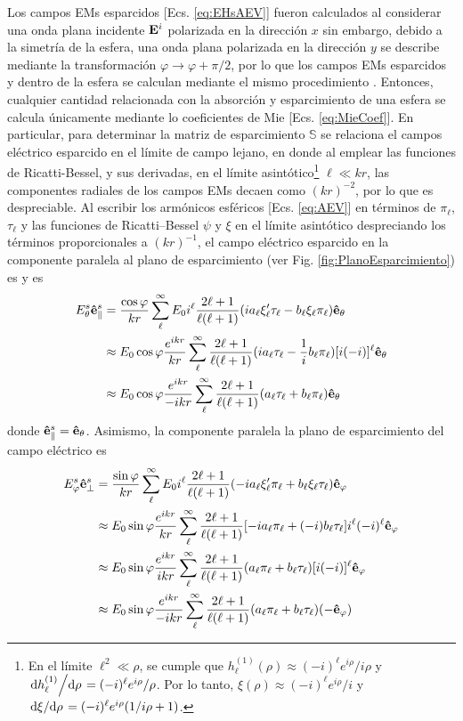 \documentclass[letterpaper,11pt] {article}
\begin{document}
Los campos EMs esparcidos [Ecs. \eqref{eq:EHsAEV}] fueron calculados al considerar una onda plana incidente $\vb{E}^i$ polarizada en la dirección $x$ sin embargo, debido a la simetría de la esfera, una onda plana polarizada en la dirección $y$ se describe mediante la transformación $\varphi\to\varphi+\pi/2$, por lo que los campos EMs esparcidos y dentro de la esfera se calculan mediante el mismo procedimiento \cite{bohren1998absorption}. Entonces, cualquier cantidad relacionada con la absorción y esparcimiento de una esfera se calcula únicamente mediante lo coeficientes de Mie [Ecs. \eqref{eq:MieCoef}]. En particular, para determinar la matriz de esparcimiento $\mathbb{S}$ se relaciona el campos eléctrico esparcido en el límite de campo lejano, en donde al emplear las funciones de Ricatti-Bessel, y sus derivadas, en el límite asintótico\footnote{En el límite $\ell^2 \ll \rho$, se cumple que $h_\ell^{(1)}(\rho)\approx (-i)^\ell e^{i\rho}/i\rho$ y $\dv*{h_\ell^{(1)}}{\rho} = (-i)^\ell e^{i\rho}/\rho$. Por lo tanto,  $\xi(\rho)\approx (-i)^\ell e^{i\rho}/i$ y $\dv*{\xi}{\rho} = (-i)^\ell e^{i\rho}(1/i\rho + 1)$.} $\ell \ll kr$, las componentes radiales de los campos EMs decaen como $(kr)^{-2}$, por lo que es despreciable. Al escribir los armónicos esféricos  [Ecs. \eqref{eq:AEV}] en términos de $\pi_\ell$, $\tau_\ell$ y las funciones de Ricatti--Bessel $\psi$ y $\xi$ en el límite asintótico despreciando los términos proporcionales a $(kr)^{-1}$, el campo eléctrico esparcido en la componente paralela al plano de esparcimiento (ver Fig. \ref{fig:PlanoEsparcimiento}) es
  y  es
	\begin{align}
	E_\theta^s \vu{e}_\parallel^s &= \frac{\cos\varphi}{kr}\sum_\ell^\infty E_0i^\ell
		\frac{2\ell+1}{\ell(\ell+1)}(i a_\ell\xi_\ell'\tau_\ell-b_\ell\xi_\ell\pi_\ell)\vu{e}_\theta\notag\\
			&\approx E_0\cos\varphi\frac{e^{ikr}}{kr}\sum_\ell^\infty\frac{2\ell+1}{\ell(\ell+1)}
				(i a_\ell \tau_\ell - \frac{1}{i}b_\ell\pi_\ell )[i(-i)]^\ell\vu{e}_\theta\notag\\
			&\approx E_0\cos\varphi\frac{e^{ikr}}{-ikr}\sum_\ell^\infty\frac{2\ell+1}{\ell(\ell+1)}
				( a_\ell \tau_\ell + b_\ell\pi_\ell )\vu{e}_\theta
								\label{eq:EthetaS}
	\end{align}
donde $\vu{e}_\parallel^s =\vu{e}_\theta$. Asimismo, la componente paralela la plano de esparcimiento del campo eléctrico es
	\begin{align}
	E_\varphi^s \vu{e}_\perp^s &= \frac{\sin\varphi}{kr}\sum_\ell^\infty E_0i^\ell\frac{2\ell+1}{\ell(\ell+1)}						(-ia_\ell\xi_\ell'\pi_\ell+b_\ell\xi_\ell\tau_\ell)\vu{e}_\varphi\notag\\
			&\approx E_0\sin\varphi\frac{e^{ikr}}{kr}\sum_\ell^\infty\frac{2\ell+1}{\ell(\ell+1)}					[-ia_\ell\pi_\ell+(-i)b_\ell\tau_\ell]i^\ell(-i)^\ell\vu{e}_\varphi\notag\\
			&\approx E_0\sin\varphi\frac{e^{ikr}}{ikr}\sum_\ell^\infty\frac{2\ell+1}{\ell(\ell+1)}					(a_\ell\pi_\ell+b_\ell\tau_\ell)[i(-i)]^\ell\vu{e}_\varphi\notag\\
			&\approx E_0\sin\varphi\frac{e^{ikr}}{-ikr}\sum_\ell^\infty\frac{2\ell+1}{\ell(\ell+1)}					(a_\ell\pi_\ell+b_\ell\tau_\ell)(-\vu{e}_\varphi)
								\label{eq:EphiS}
	\end{align}
\end{document}
